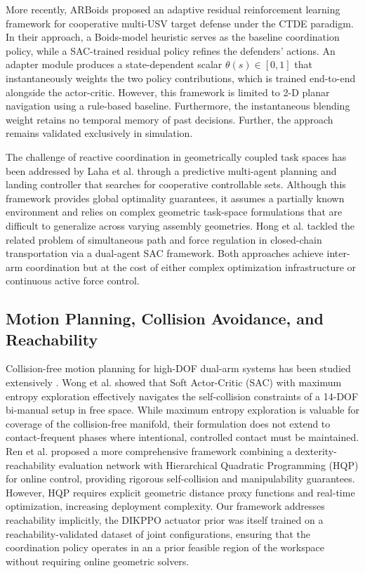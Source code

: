 \documentclass[a4paper,fleqn]{cas-dc}
\begin{document}
More recently, ARBoids \cite{arboids} proposed an adaptive residual reinforcement learning framework for cooperative multi-USV target defense under the CTDE paradigm. In their approach, a Boids-model heuristic serves as the baseline coordination policy, while a SAC-trained residual policy refines the defenders' actions. An adapter module produces a state-dependent scalar $\theta(s) \in [0,1]$ that instantaneously weights the two policy contributions, which is trained end-to-end alongside the actor-critic. However, this framework is limited to 2-D planar navigation using a rule-based baseline. Furthermore, the instantaneous blending weight retains no temporal memory of past decisions. Further, the approach remains validated exclusively in simulation.

The challenge of reactive coordination in geometrically coupled task spaces has been addressed by Laha et al. \cite{related-45} through a predictive multi-agent planning and landing controller that searches for cooperative controllable sets. Although this framework provides global optimality guarantees, it assumes a partially known environment and relies on complex geometric task-space formulations that are difficult to generalize across varying assembly geometries. Hong et al. \cite{related-46} tackled the related problem of simultaneous path and force regulation in closed-chain transportation via a dual-agent SAC framework. Both approaches achieve inter-arm coordination but at the cost of either complex optimization infrastructure or continuous active force control.

\subsection{Motion Planning, Collision Avoidance, and Reachability}
Collision-free motion planning for high-DOF dual-arm systems has been studied extensively \cite{sksp}. Wong et al. \cite{related-47} showed that Soft Actor-Critic (SAC) with maximum entropy exploration effectively navigates the self-collision constraints of a 14-DOF bi-manual setup in free space. While maximum entropy exploration is valuable for coverage of the collision-free manifold, their formulation does not extend to contact-frequent phases where intentional, controlled contact must be maintained. Ren et al. \cite{related-48} proposed a more comprehensive framework combining a dexterity-reachability evaluation network with Hierarchical Quadratic Programming (HQP) for online control, providing rigorous self-collision and manipulability guarantees. However, HQP requires explicit geometric distance proxy functions and real-time optimization, increasing deployment complexity. Our framework addresses reachability implicitly, the DIKPPO actuator prior was itself trained on a reachability-validated dataset of joint configurations, ensuring that the coordination policy operates in an a prior feasible region of the workspace without requiring online geometric solvers.
\end{document}
